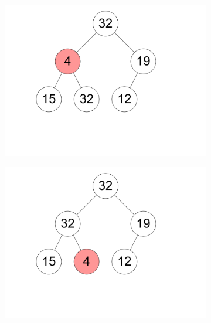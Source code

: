 \documentclass[11pt,a4paper]{article}
\begin{document}
\begin{loesung}
\begin{enumerate}
\begin{figure}[h!]
\begin{subfigure}[b]{0.23\textwidth}
                \includegraphics[width=\textwidth]{img/b8}
            \end{subfigure}
            \begin{subfigure}[b]{0.23\textwidth}
                \centering
                \includegraphics[width=\textwidth]{img/b9}
            \end{subfigure}
            \\
            \begin{subfigure}[b]{0.23\textwidth}
                \centering

\end{subfigure}
\end{figure}
\end{enumerate}
\end{loesung}
\end{document}
